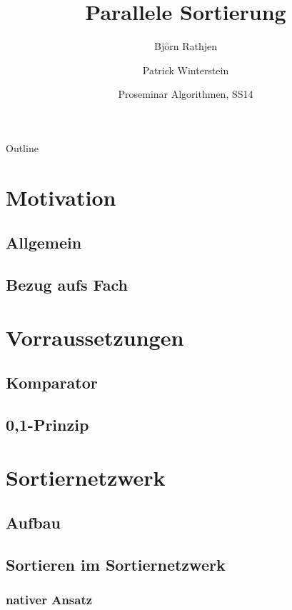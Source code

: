 \documentclass[ucs,9pt]{beamer}
\title[|| Sort] %
{Parallele Sortierung}
\author[, Another] %
{Björn Rathjen \and Patrick Winterstein}
\institute[FU Berlin] %
{Freie Universität Berlin}
\date[ProSem Algo]
{Proseminar Algorithmen, SS14}
\begin{document}
\begin{frame}[plain]
  \titlepage
\end{frame}

\begin{frame}[allowframebreaks]{Outline}
\end{frame}

\section{Motivation}
\subsection{Allgemein}
\subsection{Bezug aufs Fach}

\section{Vorraussetzungen}
\subsection{Komparator}
\subsection{0,1-Prinzip}



\section{Sortiernetzwerk}
\subsection{Aufbau}

\subsection{Sortieren im Sortiernetzwerk}
\subsubsection{nativer Ansatz}
\end{document}
